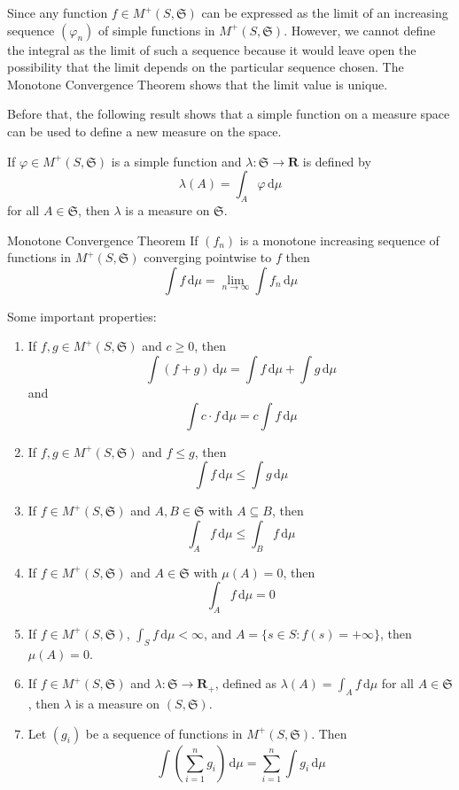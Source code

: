 Since any function $f \in M^+(S, \mathfrak{S})$ can be expressed as the limit of an increasing sequence $(\varphi_n)$ of simple functions in $M^+(S, \mathfrak{S})$. However, we cannot define the integral as the limit of such a sequence because it would leave open the possibility that the limit depends on the particular sequence chosen. The Monotone Convergence Theorem shows that the limit value is unique.

Before that, the following result shows that a simple function on a measure space can be used to define a new measure on the space.

\begin{lemma}[]{}{}
	If $\varphi \in M^+(S, \mathfrak{S})$ is a simple function and $\lambda: \mathfrak{S} \longrightarrow \textbf{R}$ is defined by
	\[
		\lambda(A) = \int_A \varphi\, \mathrm{d}\mu 
	\]
	for all $A \in \mathfrak{S}$, then $\lambda$ is a measure on $\mathfrak{S}$.
\end{lemma}

\begin{theorem}[]{Monotone Convergence Theorem}{}
	If $(f_n)$ is a monotone increasing sequence of functions in $M^+(S, \mathfrak{S})$ converging pointwise to $f$ then 
	\[
		\int f\, \mathrm{d}\mu = \lim_{n \to \infty} \int f_n \, \mathrm{d} \mu
	\]
\end{theorem}

Some important properties:

\begin{enumerate}
	\item If $f, g \in M^+(S, \mathfrak{S})$ and $c \geq 0$, then 
	\[
		\int (f+g)\, \mathrm{d}\mu = \int f\, \mathrm{d}\mu + \int g\, \mathrm{d}\mu
	\]
	and
	\[
		\int c\cdot f \, \mathrm{d}\mu = c \int f\, \mathrm{d}\mu
	\]
	\item If $f, g \in M^+(S, \mathfrak{S})$ and $f \leq g$, then
	\[
		\int f\, \mathrm{d}\mu \leq \int g\, \mathrm{d}\mu
	\]
	\item If $f \in M^+(S, \mathfrak{S})$ and $A, B \in \mathfrak{S}$ with $A \subseteq B$, then
	\[
		\int_A f\, \mathrm{d}\mu \leq \int_B f\, \mathrm{d}\mu
	\]
	\item If $f \in M^+(S, \mathfrak{S})$ and $A \in \mathfrak{S}$ with $\mu(A) = 0$, then
	\[
		\int_A f\, \mathrm{d}\mu = 0
	\]
	\item If $f \in M^+(S, \mathfrak{S})$, $\int_S f\, \mathrm{d}\mu < \infty$, and $A = \{ s \in S : f(s) = +\infty \}$, then $\mu(A) = 0$.
	\item If $f \in M^+(S, \mathfrak{S})$ and $\lambda : \mathfrak{S} \longrightarrow \textbf{R}_+$, defined as $\lambda(A) = \int_A f\, \mathrm{d}\mu$ for all $A \in \mathfrak{S}$, then $\lambda$ is a measure on $(S, \mathfrak{S})$.
	\item Let $(g_i)$ be a sequence of functions in $M^+(S, \mathfrak{S})$. Then 
	\[
		\int \left( \sum_{i=1}^n g_i \right)\, \mathrm{d}\mu = \sum_{i=1}^n \int g_i\, \mathrm{d}\mu
	\]
\end{enumerate}

